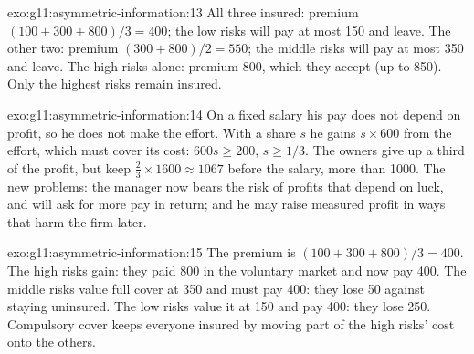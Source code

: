 \begin{solution}{exo:g11:asymmetric-information:13}
All three insured: premium $(100 + 300 + 800)/3 = 400$; the low risks will pay at most 150 and leave. The other two: premium $(300 + 800)/2 = 550$; the middle risks will pay
at most 350 and leave. The high risks alone: premium 800, which they accept (up to 850). Only the highest risks remain insured.
\end{solution}

\begin{solution}{exo:g11:asymmetric-information:14}
On a fixed salary his pay does not depend on profit, so he does not make the effort. With a share $s$ he gains $s \times 600$ from the effort, which must cover its cost:
$600s \ge 200$, $s \ge 1/3$. The owners give up a third of the profit, but keep $\tfrac23 \times 1600 \approx 1067$ before the salary, more than 1000. The new problems: the
manager now bears the risk of profits that depend on luck, and will ask for more pay in return; and he may raise measured profit in ways that harm the firm later.
\end{solution}

\begin{solution}{exo:g11:asymmetric-information:15}
The premium is $(100 + 300 + 800)/3 = 400$. The high risks gain: they paid 800 in the voluntary market and now pay 400. The middle risks value full cover at
350 and must pay 400: they lose 50 against staying uninsured. The low risks value it at 150 and pay 400: they lose 250. Compulsory cover keeps everyone insured by moving
part of the high risks' cost onto the others.
\end{solution}

